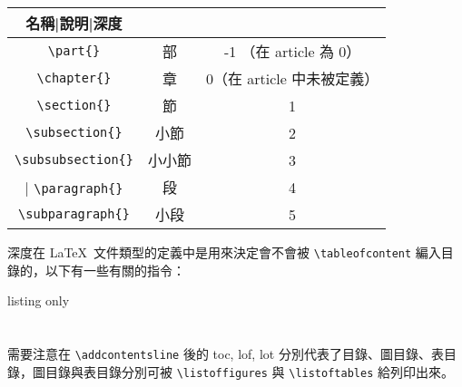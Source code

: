 \begin{tabular}{ccc}
\hline
名稱|說明|深度 \\\hline\hline
\verb|\part{}| & 部 & -1 （在 article 為 0）\\\hline
\verb|\chapter{}| & 章 & 0（在 article 中未被定義）\\\hline
\verb|\section{}| & 節 & 1 \\\hline
\verb|\subsection{}| & 小節 & 2 \\\hline
\verb|\subsubsection{}| & 小小節 & 3 \\\hline|
\verb|\paragraph{}| & 段 & 4 \\\hline
\verb|\subparagraph{}| & 小段 & 5 \\\hline
\end{tabular}

深度在 \LaTeX\ 文件類型的定義中是用來決定會不會被 \verb|\tableofcontent| 編入目錄的，以下有一些有關的指令：

\begin{tcblisting}{listing only}
\setcounter{tocdepth}{2}%
\section*{}%
\end{tcblisting}

需要注意在 \verb|\addcontentsline| 後的 toc, lof, lot 分別代表了目錄、圖目錄、表目錄，圖目錄與表目錄分別可被 \verb|\listoffigures| 與 \verb|\listoftables| 給列印出來。

